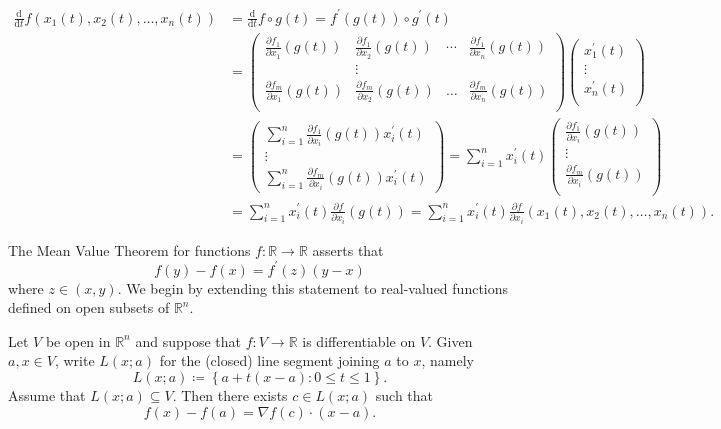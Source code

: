 \begin{align*}
    \frac{\mathrm{d}}{\mathrm{d}t} f(x_1(t), x_2(t), \dots , x_n(t)) &= \frac{\mathrm{d}}{\mathrm{d}t} f \circ g(t) = f^{\prime} (g(t)) \circ g^{\prime} (t) \\ &= \begin{pmatrix}
        \frac{\partial f_1}{\partial x_1} (g(t))  & \frac{\partial f_1}{\partial x_2} (g(t)) & \cdots & \frac{\partial f_1}{\partial x_n} (g(t))  \\
         & \vdots &  &   \\
        \frac{\partial f_m}{\partial x_1} (g(t)) & \frac{\partial f_m}{\partial x_2} (g(t)) & \dots & \frac{\partial f_m}{\partial x_n} (g(t))  \\
    \end{pmatrix} \begin{pmatrix}
         x_1^{\prime} (t) \\
         \vdots \\
         x_n^{\prime} (t) \\
    \end{pmatrix} \\
    &= \begin{pmatrix}
         \sum_{i=1}^n \frac{\partial f_1}{\partial x_i} (g(t)) x_i^{\prime} (t)   \\
         \vdots \\
         \sum_{i=1}^n \frac{\partial f_m}{\partial x_i} (g(t)) x_i^{\prime} (t)  
    \end{pmatrix} = \sum_{i=1}^n x_i^{\prime} (t) \begin{pmatrix}
             \frac{\partial f_1}{\partial x_i} (g(t))  \\
              \vdots\\
              \frac{\partial f_m}{\partial x_i} (g(t)) \\
         \end{pmatrix} \\
         &= \sum_{i=1}^n x_i^{\prime} (t) \frac{\partial f}{\partial x_i} (g(t)) = \sum_{i=1}^n x_i^{\prime} (t) \frac{\partial f}{\partial x_i} (x_1(t), x_2(t), \dots , x_n(t)).    
\end{align*}

The Mean Value Theorem for functions \(f: \mathbb{R} \to \mathbb{R} \) asserts that 
\[
    f(y) - f(x) = f^{\prime} (z) (y - x)
\] 
where \(z \in (x, y)\). We begin by extending this statement to real-valued functions defined on open subsets of \(\mathbb{R} ^n\). 

\begin{theorem} \label{thm: MVT for real valued func}
    Let \(V\) be open in \(\mathbb{R} ^n\) and suppose that \(f: V \to \mathbb{R} \) is differentiable on \(V\). Given \(a, x \in V\), write \(L(x; a)\) for the (closed) line segment joining \(a\) to \(x\), namely 
    \[
        L(x ; a) \coloneqq \left\{ a + t(x - a) : 0 \le t \le 1 \right\}. 
    \]       
    Assume that \(L(x; a) \subseteq V\). Then there exists \(c \in L(x; a)\) such that 
    \[
        f(x) - f(a) = \nabla f(c) \cdot (x - a).
    \]  
\end{theorem} 

